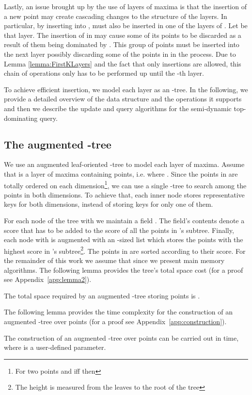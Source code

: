 \documentclass{llncs}
\begin{document}
Lastly, an issue brought up by the use of layers of maxima is that the insertion of a new point  may create cascading changes to the structure of the layers. In particular, by inserting  into ,  must also be inserted in one of the layers of . Let  be that layer. The insertion of  in  may cause some of its points to be discarded as a result of them being dominated by . This group of points must be inserted into the next layer  possibly discarding some of the points in  in the process. Due to Lemma \ref{lemma:FirstKLayers} and the fact that only insertions are allowed, this chain of operations only has to be performed up until the -th layer.

To achieve efficient insertion, we model each layer as an -tree. In the following, we provide a detailed overview of the data structure and the operations it supports and then we describe the update and query algorithms for the semi-dynamic top- dominating query.




\subsection{The augmented -tree} \label{subsection:AugABTree}
We use an augmented leaf-oriented -tree to model each layer of maxima. Assume that  is a layer of maxima containing  points, i.e.  where . Since the points in  are totally ordered on each dimension\footnote{For two points  and  iff  then }, we can use a single -tree to search among the points in both dimensions. To achieve that, each inner node stores representative keys for both dimensions, instead of storing keys for only one of them.

For each node  of the tree with  we maintain a field . The field's contents denote a score that has to be added to the score of all the points in 's subtree. Finally, each node  with  is augmented with an -sized list  which stores the  points with the highest score in 's subtree\footnote{The height is measured from the leaves to the root of the tree}. The points in  are sorted according to their score. For the remainder of this work we assume that  since we present main memory algorithms. The following lemma provides the tree's total space cost (for a proof see Appendix~\ref{app:lemma2}).
\begin{lemma} \label{lemma:AugABTreeTotalSpace}
The total space required by an augmented -tree storing  points is .
\end{lemma}


The following lemma provides the time complexity for the construction of an augmented -tree over  points (for a proof see Appendix~\ref{app:construction}).
\begin{lemma} \label{lemma:construction}
The construction of an augmented -tree over  points can be carried out in  time, where  is a user-defined parameter.
\end{lemma}
\end{document}
